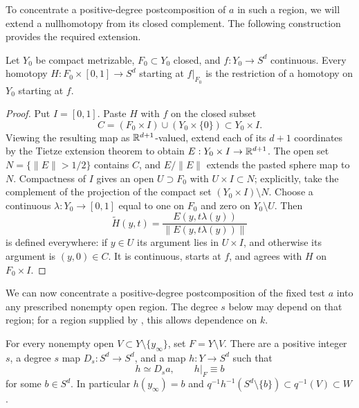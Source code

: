 To concentrate a positive-degree postcomposition of $a$ in such a
region, we will extend a nullhomotopy from its closed complement.
The following construction provides the required extension.

\begin{lemma}
\label{top:neighborhood-extension}
Let $Y_0$ be compact metrizable, $F_0\subset Y_0$ closed, and
$f:Y_0\to S^d$ continuous.  Every homotopy
$H:F_0\times[0,1]\to S^d$ starting at $f|_{F_0}$ is the
restriction of a homotopy on $Y_0$ starting at $f$.
\end{lemma}

\begin{proof}
Put $I=[0,1]$.  Paste $H$ with $f$ on the closed subset
\[
 C=(F_0\times I)\cup(Y_0\times\{0\})\subset Y_0\times I.
\]
Viewing the resulting map as $\mathbb R^{d+1}$-valued, extend each of its $d+1$
coordinates by the Tietze extension theorem to obtain
$E:Y_0\times I\to\mathbb R^{d+1}$.  The open set
$N=\{\|E\|>1/2\}$ contains $C$, and $E/\|E\|$ extends the
pasted sphere map to $N$.  Compactness of $I$ gives an open
$U\supset F_0$ with $U\times I\subset N$; explicitly, take the
complement of the projection of the compact set
$(Y_0\times I)\setminus N$.
Choose a continuous $\lambda:Y_0\to[0,1]$ equal to one on $F_0$
and zero on $Y_0\setminus U$.  Then
\[
 \widetilde H(y,t)
   =\frac{E(y,t\lambda(y))}{\|E(y,t\lambda(y))\|}
\]
is defined everywhere: if $y\in U$ its argument lies in
$U\times I$, and otherwise its argument is $(y,0)\in C$.
It is continuous, starts at $f$, and agrees with $H$ on
$F_0\times I$.
\end{proof}

We can now concentrate a positive-degree postcomposition of the fixed
test $a$ into any prescribed nonempty open region.  The degree $s$
below may depend on that region; for a region supplied by
, this allows dependence on $k$.

\begin{proposition}
\label{prop:move-test}
For every nonempty open $V\subset Y\setminus\{y_\infty\}$, set
$F=Y\setminus V$.  There are a positive integer $s$, a degree
$s$ map $D_s:S^d\to S^d$, and a map $h:Y\to S^d$ such that
\[
 h\simeq D_sa,
 \qquad h|_F\equiv b
\]
for some $b\in S^d$.  In particular $h(y_\infty)=b$ and
$q^{-1}h^{-1}(S^d\setminus\{b\})\subset q^{-1}(V)\subset W$.
\end{proposition}

